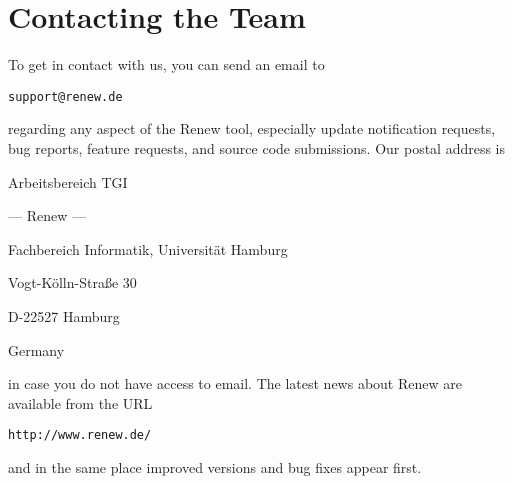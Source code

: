 \chapter{Contacting the Team}
\label{ap:contact}%

To get in contact with us, you can send an email to

\medskip

  \texttt{support@renew.de}

\medskip

\noindent
regarding any aspect of the Renew tool, especially update 
notification requests, bug reports, feature requests, and
source code submissions. Our postal address is

\medskip

  Arbeitsbereich TGI
\par%
  \indent\indent --- Renew ---
\par%
  Fachbereich Informatik, Universit\"at Hamburg
\par%
  Vogt-K\"olln-Stra\ss e 30
\par%
  D-22527 Hamburg
\par%
  Germany

\medskip

\noindent
in case you do not have access to email. The latest
news about Renew are available from the URL

\medskip

  \texttt{http://www.renew.de/}

\medskip

\noindent
and in the same place improved versions and bug fixes 
appear first.
